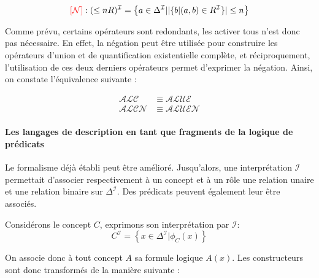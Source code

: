 \begin{displaymath}
  \textcolor{red}{[\mathcal{N}]} : ( \leq nR )^\mathcal{I}  = \left\{ a \in \Delta^\mathcal{I} | |\{b| (a,b) \in R^\mathcal{I}\}| \leq n \right\}
\end{displaymath}

\par Comme prévu, certains opérateurs sont redondants, les  activer tous n'est donc pas nécessaire. En effet, la négation peut être utilisée pour construire les opérateurs d'union et de quantification existentielle complète, et réciproquement, l'utilisation de ces deux derniers opérateurs permet d'exprimer la négation. Ainsi, on constate l'équivalence suivante :

\begin{align}
  \mathcal{ALC}  & \equiv \mathcal{ALUE}\\
  \mathcal{ALCN}  & \equiv \mathcal{ALUEN}
\end{align}


\paragraph{Les langages de description en tant que fragments de la logique de prédicats}
\label{sec:les-langages-de-1}

\par Le formalisme déjà établi peut être amélioré. Jusqu'alors, une interprétation $\mathcal{I}$ permettait d'associer respectivement à un concept et à un rôle  une relation unaire et une relation binaire sur $\Delta^\mathcal{I}$. Des prédicats peuvent également leur être associés.
\begin{exemple}
  Considérons le concept $C$, exprimons son interprétation par $\mathcal{I}$: 
  \begin{displaymath}
    C^\mathcal{I} = \left\{ x \in \Delta^\mathcal{I} | \phi_C(x) \right\}
  \end{displaymath}
\end{exemple}


\par On associe donc à tout concept $A$ sa formule logique $A(x)$. Les constructeurs sont donc transformés de la manière suivante :

